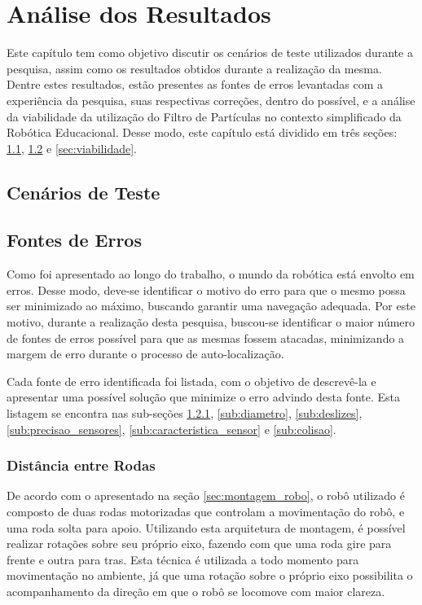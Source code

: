 \chapter[Análise dos Resultados]{Análise dos Resultados}

Este capítulo tem como objetivo discutir os cenários de teste utilizados durante a pesquisa, assim como os resultados obtidos durante a realização da mesma.
Dentre estes resultados, estão presentes as fontes de erros levantadas com a experiência da pesquisa, suas respectivas correções, dentro do possível, e a análise da
viabilidade da utilização do Filtro de Partículas no contexto simplificado da Robótica Educacional. Desse modo, este capítulo está dividido
em três seções: \ref{sec:cenarios_teste}, \ref{sec:fontes_de_erros} e \ref{sec:viabilidade}.

\section{Cenários de Teste}
\label{sec:cenarios_teste}


\section{Fontes de Erros}
\label{sec:fontes_de_erros}

Como foi apresentado ao longo do trabalho, o mundo da robótica está envolto em erros. Desse modo, deve-se identificar o motivo do erro
para que o mesmo possa ser minimizado ao máximo, buscando garantir uma navegação adequada.
Por este motivo, durante a realização desta pesquisa, buscou-se identificar o maior número de fontes de erros possível para que as mesmas fossem
atacadas, minimizando a margem de erro durante o processo de auto-localização.

Cada fonte de erro identificada foi listada, com o objetivo de descrevê-la e apresentar uma possível solução que minimize o erro
advindo desta fonte. Esta listagem se encontra nas sub-seções \ref{sub:distancia_rodas}, \ref{sub:diametro}, \ref{sub:deslizes}, \ref{sub:precisao_sensores},
\ref{sub:caracteristica_sensor} e \ref{sub:colisao}.

\subsection{Distância entre Rodas}
\label{sub:distancia_rodas}

De acordo com o apresentado na seção \ref{sec:montagem_robo}, o robô utilizado é composto de duas rodas motorizadas que controlam
a movimentação do robô, e uma roda solta para apoio. Utilizando esta arquitetura de montagem, é possível realizar rotações sobre seu
próprio eixo, fazendo com que uma roda gire para frente e outra para tras. Esta técnica é utilizada a todo momento para movimentação
no ambiente, já que uma rotação sobre o próprio eixo possibilita o acompanhamento da direção em que o robô se locomove com maior clareza.


